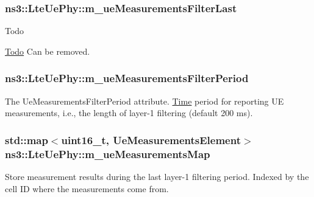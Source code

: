 \subsubsection[{\texorpdfstring{m\+\_\+ue\+Measurements\+Filter\+Last}{m_ueMeasurementsFilterLast}}]{ ns3\+::\+Lte\+Ue\+Phy\+::m\+\_\+ue\+Measurements\+Filter\+Last\hspace{0.3cm}{\ttfamily [private]}}\hypertarget{classns3_1_1LteUePhy_a075d805213fceb00b0298b183d68f157}{}\label{classns3_1_1LteUePhy_a075d805213fceb00b0298b183d68f157}
\begin{DoxyRefDesc}{Todo}
\item[\hyperlink{todo__todo000099}{Todo}]Can be removed. \end{DoxyRefDesc}
\subsubsection[{\texorpdfstring{m\+\_\+ue\+Measurements\+Filter\+Period}{m_ueMeasurementsFilterPeriod}}]{ ns3\+::\+Lte\+Ue\+Phy\+::m\+\_\+ue\+Measurements\+Filter\+Period\hspace{0.3cm}{\ttfamily [private]}}\hypertarget{classns3_1_1LteUePhy_acb16dbec02523a0642f73eb98292ed2f}{}\label{classns3_1_1LteUePhy_acb16dbec02523a0642f73eb98292ed2f}
The {\ttfamily Ue\+Measurements\+Filter\+Period} attribute. \hyperlink{classns3_1_1Time}{Time} period for reporting UE measurements, i.\+e., the length of layer-\/1 filtering (default 200 ms). 
\subsubsection[{\texorpdfstring{m\+\_\+ue\+Measurements\+Map}{m_ueMeasurementsMap}}]{\setlength{\rightskip}{0pt plus 5cm}std\+::map$<$uint16\+\_\+t, {\bf Ue\+Measurements\+Element}$>$ ns3\+::\+Lte\+Ue\+Phy\+::m\+\_\+ue\+Measurements\+Map\hspace{0.3cm}{\ttfamily [private]}}\hypertarget{classns3_1_1LteUePhy_a3d064f4bdc58614aa1e12c44a8ec111b}{}\label{classns3_1_1LteUePhy_a3d064f4bdc58614aa1e12c44a8ec111b}
Store measurement results during the last layer-\/1 filtering period. Indexed by the cell ID where the measurements come from. 

